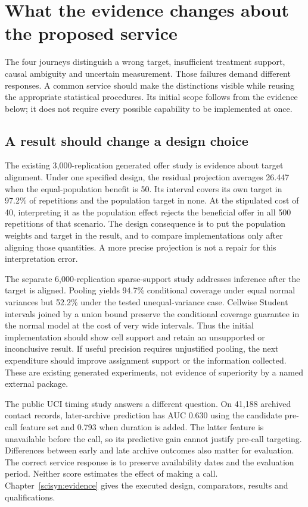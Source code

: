 \chapter{What the evidence changes about the proposed service}
\label{rewrite:evidence-consequences}

The four journeys distinguish a wrong target, insufficient treatment support,
causal ambiguity and uncertain measurement. Those failures demand different
responses. A common service should make the distinctions visible while
reusing the appropriate statistical procedures. Its initial scope follows
from the evidence below; it does not require every possible capability to
be implemented at once.

\section{A result should change a design choice}
The existing 3,000-replication generated offer study is evidence about target
alignment. Under one specified design, the residual projection averages
26.447 when the equal-population benefit is 50. Its interval covers its own
target in 97.2\% of repetitions and the population target in none. At the
stipulated cost of 40, interpreting it as the population effect rejects the
beneficial offer in all 500 repetitions of that scenario. The design
consequence is to put the population weights and target in the result,
and to compare implementations only after aligning those quantities. A
more precise projection is not a repair for this interpretation error.

The separate 6,000-replication sparse-support study addresses inference
after the target is aligned. Pooling yields 94.7\% conditional coverage
under equal normal variances but 52.2\% under the tested unequal-variance
case. Cellwise Student intervals joined by a union bound preserve the
conditional coverage guarantee in the normal model at the cost of very
wide intervals. Thus the initial implementation should show cell support
and retain an unsupported or inconclusive result. If useful precision
requires unjustified pooling, the next expenditure should improve assignment
support or the information collected. These are existing generated
experiments, not evidence of superiority by a named external package.

The public UCI timing study answers a different question. On 41,188 archived
contact records, later-archive prediction has AUC 0.630 using the candidate
pre-call feature set and 0.793 when duration is added. The latter feature
is unavailable before the call, so its predictive gain cannot justify
pre-call targeting. Differences between early and late archive outcomes
also matter for evaluation. The correct service response is to preserve
availability dates and the evaluation period. Neither score estimates
the effect of making a call. Chapter~\ref{scisyn:evidence} gives the
executed design, comparators, results and qualifications.

